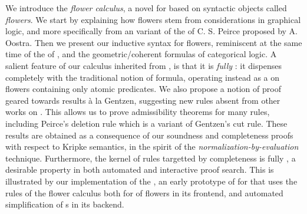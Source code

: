 \begin{scope}


We introduce the \emph{flower calculus}, a novel  for
  based on syntactic objects called
\emph{flowers}. We start by explaining how flowers stem from considerations in
graphical logic, and more specifically from an  variant of
the \emph{} of C. S. Peirce proposed by A. Oostra. Then we
present our inductive syntax for flowers, reminiscent at the same time of the
 of  , and the geometric/coherent
formulas of categorical logic. A salient feature of our calculus inherited from
, is that it is \emph{fully }: it dispenses completely with
the traditional notion of  formula, operating instead as a
 on flowers containing only atomic predicates. We also propose a
notion of proof geared towards  results à la Gentzen, suggesting new
rules absent from other works on  . This allows us to
prove admissibility theorems for many rules, including Peirce's deletion rule
which is a variant of Gentzen's cut rule. These results are obtained as a
consequence of our soundness and completeness proofs with respect to Kripke
semantics, in the spirit of the \emph{normalization-by-evaluation} technique.
Furthermore, the kernel of rules targetted by completeness is fully ,
a desirable property in both automated and interactive proof search. This is
illustrated by our implementation of the , an early prototype of
 for  that uses the rules of the flower calculus both for  of flowers in its frontend, and automated simplification of s
in its backend.


\end{scope}
